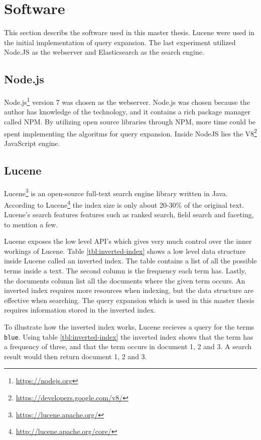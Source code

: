 \section{Software}
This section describs the software used in this master thesis.
Lucene were used in the initial implementation of query expansion.
The last experiment utilized Node.JS as the webserver and Elasticsearch as the search engine.

\subsection{Node.js}
Node.js\footnote{\url{https://nodejs.org}} version 7 was chosen as the webserver.
Node.js was chosen because the author has knowledge of the technology,
and it contains a rich package manager called NPM.
By utilizing open source libraries through NPM, more time could be spent implementing the algoritms for query expansion.
Inside NodeJS lies the V8\footnote{\url{https://developers.google.com/v8/}} JavaScript engine.

\subsection{Lucene}
Lucene\footnote{\url{https://lucene.apache.org/}} is an open-source full-text search engine library written in Java.
According to Lucene\footnote{\url{http://lucene.apache.org/core/}} the index size is only about 20-30\% of the original text.
Lucene's search features features such as ranked search, field search and faceting, to mention a few.

Lucene exposes the low level API's which gives very much control over the inner workings of Lucene.
Table \ref{tbl:inverted-index} shows a low level data structure inside Lucene called an inverted index.
The table contains a list of all the possible terms inside a text.
The second column is the frequency each term has.
Lastly, the documents column list all the documents where the given term occurs.
An inverted index requires more resources when indexing,
but the data structure are effective when searching.
The query expansion which is used in this master thesis requires information stored in the inverted index.

To illustrate how the inverted index works, Lucene recieves a query for the terms \texttt{blue}.
Using table \ref{tbl:inverted-index} the inverted index shows that the term has a frequency of three,
and that the term occurs in document 1, 2 and 3.
A search result would then return document 1, 2 and 3.

